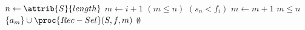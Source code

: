 \begin{codebox}
\li	$n \gets \attrib{S}{length}$
\li	$m \gets i + 1$
\li	\While $(m \leq n)$ \And $(s_n < f_i)$
\li	\Do
		$m \gets m + 1$
	\End
\li	\If $m \leq n$
\li	\Then
		\Return $\{a_m\} \cup \proc{Rec-Sel}(S,f,m)$
\li	\Else
\li		\Return $\emptyset$
	\End
\end{codebox}